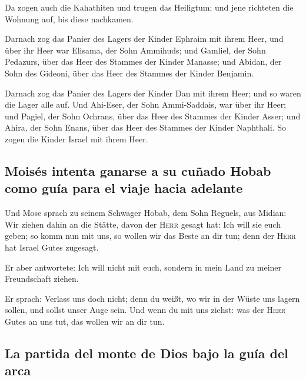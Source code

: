  Da zogen auch die Kahathiten und trugen das Heiligtum;
und jene richteten die Wohnung auf, bis diese nachkamen.

 Darnach zog das Panier des Lagers der Kinder Ephraim mit
ihrem Heer, und über ihr Heer war Elisama, der Sohn Ammihuds;
 und Gamliel, der Sohn Pedazurs, über das Heer des
Stammes der Kinder Manasse;  und Abidan, der Sohn des
Gideoni, über das Heer des Stammes der Kinder Benjamin.

 Darnach zog das Panier des Lagers der Kinder Dan mit
ihrem Heer; und so waren die Lager alle auf. Und Ahi-Eser, der Sohn
Ammi-Saddais, war über ihr Heer;  und Pagiel, der Sohn
Ochrans, über das Heer des Stammes der Kinder Asser;  und
Ahira, der Sohn Enans, über das Heer des Stammes der Kinder Naphthali.
 So zogen die Kinder Israel mit ihrem Heer.

\hypertarget{moisuxe9s-intenta-ganarse-a-su-cuuxf1ado-hobab-como-guuxeda-para-el-viaje-hacia-adelante}{%
\subsection{Moisés intenta ganarse a su cuñado Hobab como guía para el
viaje hacia
adelante}\label{moisuxe9s-intenta-ganarse-a-su-cuuxf1ado-hobab-como-guuxeda-para-el-viaje-hacia-adelante}}

 Und Mose sprach zu seinem Schwager Hobab, dem Sohn
Reguels, aus Midian: Wir ziehen dahin an die Stätte, davon der
\textsc{Herr} gesagt hat: Ich will sie euch geben; so komm nun mit uns,
so wollen wir das Beste an dir tun; denn der \textsc{Herr} hat Israel
Gutes zugesagt.

 Er aber antwortete: Ich will nicht mit euch, sondern in
mein Land zu meiner Freundschaft ziehen.

 Er sprach: Verlass uns doch nicht; denn du weißt, wo wir
in der Wüste uns lagern sollen, und sollst unser Auge sein.
 Und wenn du mit uns ziehst: was der \textsc{Herr} Gutes
an uns tut, das wollen wir an dir tun.

\hypertarget{la-partida-del-monte-de-dios-bajo-la-guuxeda-del-arca}{%
\subsection{La partida del monte de Dios bajo la guía del
arca}\label{la-partida-del-monte-de-dios-bajo-la-guuxeda-del-arca}}

